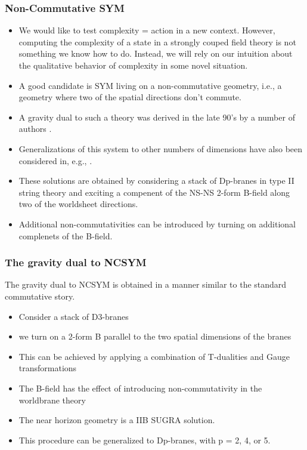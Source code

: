 \documentclass[10pt]{beamer}
\begin{document}
\begin{frame}
\frametitle{Non-Commutative SYM}

\begin{itemize}

\item We would like to test complexity = action in a new context. However, computing the complexity of a state in a strongly couped field theory is not something we know how to do. Instead, we will rely on our intuition about the qualitative behavior of complexity in some novel situation.

\item A good candidate is SYM living on a non-commutative geometry, i.e., a geometry where two of the spatial directions don't commute.

\item A gravity dual to such a theory was derived in the late 90's by a number of authors \cite{Hashimoto:1999ut, Maldacena:1999mh}.

\item Generalizations of this system to other numbers of dimensions have also been considered in, e.g., \cite{Alishahiha:1999ci, Berman:2000jw}.

\item These solutions are obtained by considering a stack of Dp-branes in type II string theory and exciting a compenent of the NS-NS 2-form B-field along two of the worldsheet directions.

\item Additional non-commutativities can be introduced by turning on additional complenets of the B-field.

\end{itemize}

\end{frame}

\begin{frame}
\frametitle{The gravity dual to NCSYM}

The gravity dual to NCSYM is obtained in a manner similar to the standard commutative story.

\begin{itemize}

\item Consider a stack of D3-branes

\item we turn on a 2-form B parallel to the two spatial dimensions of the branes

\item This can be achieved by applying a combination of T-dualities and Gauge transformations

\item The B-field has the effect of introducing non-commutativity in the worldbrane theory

\item The near horizon geometry is a IIB SUGRA solution.

\item This procedure can be generalized to Dp-branes, with p = 2, 4, or 5.

\end{itemize}

\end{frame}
\end{document}
